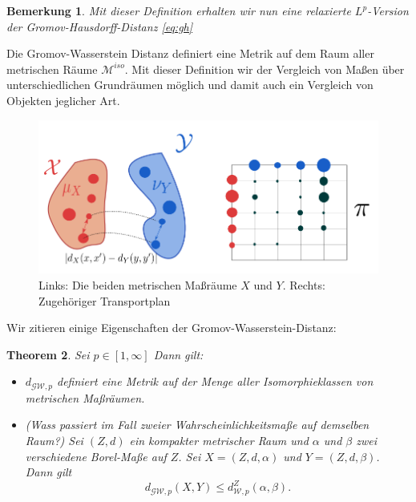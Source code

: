 \documentclass[11pt,a4paper]{article}
\newtheorem{theorem}{Theorem}[subsection]
\newtheorem{remark}[theorem]{Bemerkung}
\numberwithin{equation}{section}
\begin{document}
	\begin{remark}
		Mit dieser Definition erhalten wir nun eine relaxierte $L^p$-Version der Gromov-Hausdorff-Distanz \autoref{eq:gh}
	\end{remark}
	Die Gromov-Wasserstein Distanz definiert eine Metrik auf dem Raum aller metrischen Räume $\mathcal{M}^{iso}$. 
	Mit dieser Definition wir der Vergleich von Maßen über unterschiedlichen Grundräumen möglich und damit auch ein Vergleich von Objekten jeglicher Art.
	
	\begin{figure}[h]
		\begin{center}
			\includegraphics[width=0.3\textheight]{gwd_Transportplan.png}
			\caption[Beispiel der Gromov-Wasserstein-Distanz]{Links: Die beiden metrischen Maßräume $X$ und $Y$. Rechts: Zugehöriger Transportplan}
		\end{center}
	\end{figure}
	
	Wir zitieren einige Eigenschaften der Gromov-Wasserstein-Distanz:
	
	\begin{theorem}\cite[Thm. 5.1]{memoli2011gromov} Sei $p \in [1, \infty]$ Dann gilt:
		\begin{itemize}
			\item[(a)] $d_{\mathcal{GW},p}$ definiert eine Metrik auf der Menge aller Isomorphieklassen von metrischen Maßräumen. 
			\item[(b)] (Wass passiert im Fall zweier Wahrscheinlichkeitsmaße auf demselben Raum?) Sei $(Z,d)$ ein kompakter metrischer Raum und $\alpha$ und $\beta$ zwei verschiedene Borel-Maße auf $Z$. Sei $X=(Z,d,\alpha)$ und $Y=(Z,d,\beta)$. Dann gilt
			\begin{equation}
				d_{\mathcal{GW},p}(X,Y) \leq d_{\mathcal{W},p}^Z(\alpha,\beta).
			\end{equation}
		\end{itemize}
		
	\end{theorem}
	 
\end{document}
